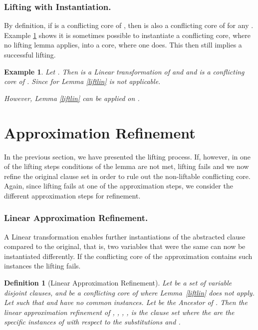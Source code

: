 \documentclass{llncs}
\newtheorem{defin}{Definition}
\newtheorem{exmp}{Example}
\begin{document}
\subsubsection{Lifting with Instantiation.}
By definition, if  is a conflicting core of , then  is also a conflicting core of  for any . 
Example \ref{liftex} shows it is sometimes possible to instantiate a conflicting core, where no lifting lemma applies, into a core, where one does.
This then still implies a successful lifting.

\begin{exmp}\label{liftex}
Let  . 
Then   is a Linear transformation of  and
and     is a conflicting core of .
Since for   Lemma \ref{liftlin} is not applicable.

However,  Lemma \ref{liftlin} can be applied on   .
\end{exmp} 



\section{Approximation Refinement}\label{abstrref}

In the previous section, we have presented the lifting process.
If, however, in one of the lifting steps  conditions of the lemma are not met, lifting fails and 
we now refine the original clause set in order to rule out the non-liftable conflicting core.
Again, since lifting fails at one of the approximation steps, we consider the different
approximation steps for refinement.


\subsubsection{Linear Approximation Refinement.}
A Linear transformation
enables further instantiations of the abstracted clause compared to the original, 
that is, two variables that were the same can now be instantiated differently. 
If the conflicting core of the approximation contains such instances the lifting fails.

\begin{defin}[Linear Approximation Refinement]
Let  be a set of variable disjoint clauses, 
 and
 be a conflicting core of  where Lemma~\ref{liftlin} does not apply.
Let 
 such that  and  have no common instances. 
Let  be the Ancestor of .
Then the \emph{linear approximation refinement} of , , , ,  is the clause
set  where the  are the specific
instances of  with respect to the substitutions  and
.
\end{defin}
\end{document}
